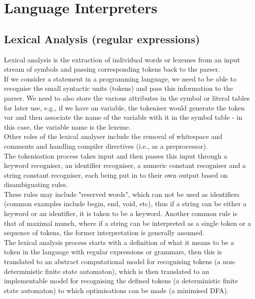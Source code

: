 \section{Language Interpreters}

\subsection{Lexical Analysis (regular expressions)}


Lexical analysis is the extraction of individual words or lexemes from an input stream of symbols and passing corresponding tokens back to the parser.\\

If we consider a statement in a programming language, we need to be able to recognise the small syntactic units (tokens) and pass this information to the parser. We need to also store the various attributes in the symbol or literal tables for later use, e.g., if we have an variable, the tokeniser would generate the token var and then associate the name of the variable with it in the symbol table - in this case, the variable name is the lexeme.\\

Other roles of the lexical analyser include the removal of whitespace and comments and handling compiler directives (i.e., as a preprocessor).\\

The tokenisation process takes input and then passes this input through a keyword recogniser, an identifier recogniser, a numeric constant recogniser and a string constant recogniser, each being put in to their own output based on disambiguating rules.\\

These rules may include "reserved words", which can not be used as identifiers (common examples include begin, end, void, etc), thus if a string can be either a keyword or an identifier, it is taken to be a keyword. Another common rule is that of maximal munch, where if a string can be interpreted as a single token or a sequence of tokens, the former interpretation is generally assumed.\\


The lexical analysis process starts with a definition of what it means to be a token in the language with regular expressions or grammars, then this is translated to an abstract computational model for recognising tokens (a non-deterministic finite state automaton), which is then translated to an implementable model for recognising the defined tokens (a deterministic finite state automaton) to which optimisations can be made (a minimised DFA).




